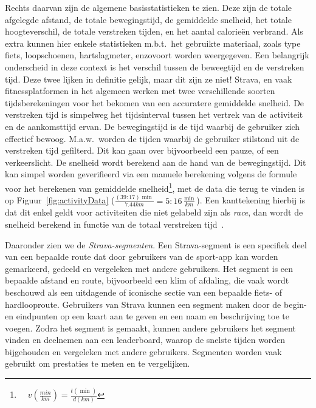 Rechts daarvan zijn de algemene basisstatistieken te zien. Deze zijn de totale
afgelegde afstand, de totale bewegingstijd, de gemiddelde snelheid, het totale
hoogteverschil, de totale verstreken tijden, en het aantal calorieën verbrand.
Als extra kunnen hier enkele statistieken m.b.t.\ het gebruikte materiaal,
zoals type fiets, loopschoenen, hartslagmeter, enzovoort worden weergegeven.
Een belangrijk onderscheid in deze context is het verschil tussen de beweegtijd
en de verstreken tijd. Deze twee lijken in definitie gelijk, maar dit zijn ze
niet! Strava, en vaak fitnessplatformen in het algemeen werken met twee
verschillende soorten tijdsberekeningen voor het bekomen van een accuratere
gemiddelde snelheid. De verstreken tijd is simpelweg het tijdsinterval tussen
het vertrek van de activiteit en de aankomsttijd ervan. De bewegingstijd is de
tijd waarbij de gebruiker zich effectief bewoog. M.a.w.\ worden de tijden
waarbij de gebruiker stilstond uit de verstreken tijd gefilterd. Dit kan gaan
over bijvoorbeeld een pauze, of een verkeerslicht. De snelheid wordt berekend
aan de hand van de bewegingstijd. Dit kan simpel worden geverifieerd via een
manuele berekening volgens de formule voor het berekenen van gemiddelde
snelheid\footnote{$ \quad v(\frac{min}{km}) = \frac{t(\min)}{d(km)}$}, met de
data die terug te vinden is op Figuur~\ref{fig:activityData}
($\frac{(39:17)\min}{7.44 km} = 5:16 \frac{\min}{km}$). Een kanttekening
hierbij is dat dit enkel geldt voor activiteiten die niet gelabeld zijn als
\textit{race}, dan wordt de snelheid berekend in functie van de totaal
verstreken tijd~\cite{MovingTi80:online}.

Daaronder zien we de \textit{Strava-segmenten}. Een Strava-segment is een
specifiek deel van een bepaalde route dat door gebruikers van de sport-app kan
worden gemarkeerd, gedeeld en vergeleken met andere gebruikers. Het segment is
een bepaalde afstand en route, bijvoorbeeld een klim of afdaling, die vaak
wordt beschouwd als een uitdagende of iconische sectie van een bepaalde fiets-
of hardlooproute. Gebruikers van Strava kunnen een segment maken door de begin-
en eindpunten op een kaart aan te geven en een naam en beschrijving toe te
voegen. Zodra het segment is gemaakt, kunnen andere gebruikers het segment
vinden en deelnemen aan een leaderboard, waarop de snelste tijden worden
bijgehouden en vergeleken met andere gebruikers. Segmenten worden vaak gebruikt
om prestaties te meten en te vergelijken.

